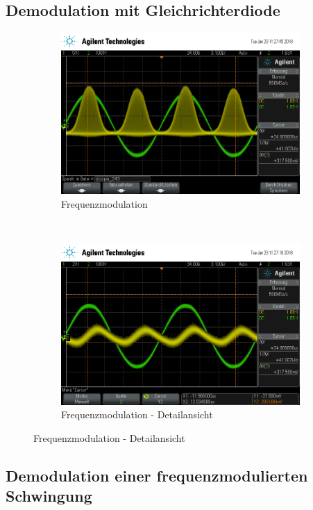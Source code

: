 \subsection{Demodulation mit Gleichrichterdiode}

\begin{figure}[t!]
	\centering
	\begin{subfigure}[t]{0.5\textwidth}
		\centering
		\includegraphics[width=\textwidth]{img/g_scope_243.png}
		\caption{Frequenzmodulation}
	\end{subfigure}%
	~
	\begin{subfigure}[t]{0.5\textwidth}
		\centering
		\includegraphics[width=\textwidth]{img/g_scope_242.png}
		\caption{Frequenzmodulation - Detailansicht}
	\end{subfigure}
\end{figure}

\subsection{Demodulation einer frequenzmodulierten Schwingung}

